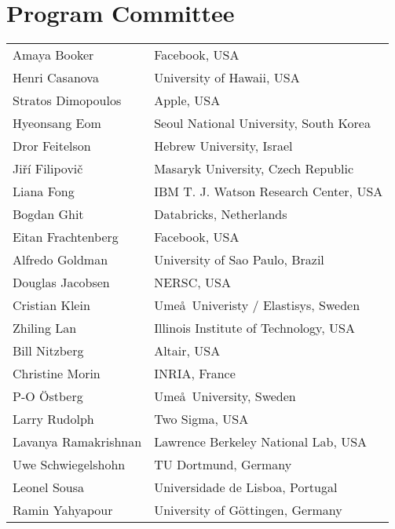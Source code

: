 \documentclass{llncs}
\begin{document}
\section*{Program Committee}
\begin{tabular}{@{}p{5cm}@{}p{7.2cm}@{}}

Amaya Booker &Facebook, USA\\
Henri Casanova &University of Hawaii, USA\\
Stratos Dimopoulos	&Apple, USA\\
Hyeonsang	Eom	&Seoul National University, South Korea\\
Dror	Feitelson	&Hebrew University, Israel\\
Ji\v{r}\'{i} Filipovi\v{c} &Masaryk University, Czech Republic\\
Liana	Fong	&IBM T. J. Watson Research Center, USA\\
Bogdan Ghit &Databricks, Netherlands\\
Eitan	Frachtenberg	&Facebook, USA\\
Alfredo	Goldman	&University of Sao Paulo, Brazil\\
Douglas Jacobsen &NERSC, USA\\
Cristian Klein &Ume\aa~Univeristy / Elastisys, Sweden\\
Zhiling Lan &Illinois Institute of Technology, USA\\
Bill	Nitzberg	&Altair, USA\\
Christine Morin &INRIA, France\\
P-O \"Ostberg &Ume\aa~University, Sweden\\
Larry	Rudolph &Two Sigma, USA\\
Lavanya Ramakrishnan &Lawrence Berkeley National Lab, USA\\
Uwe Schwiegelshohn &TU Dortmund, Germany\\
Leonel Sousa &Universidade de Lisboa, Portugal\\
Ramin	Yahyapour	&University of G\"ottingen, Germany\\
\end{tabular}
%
\end{document}
